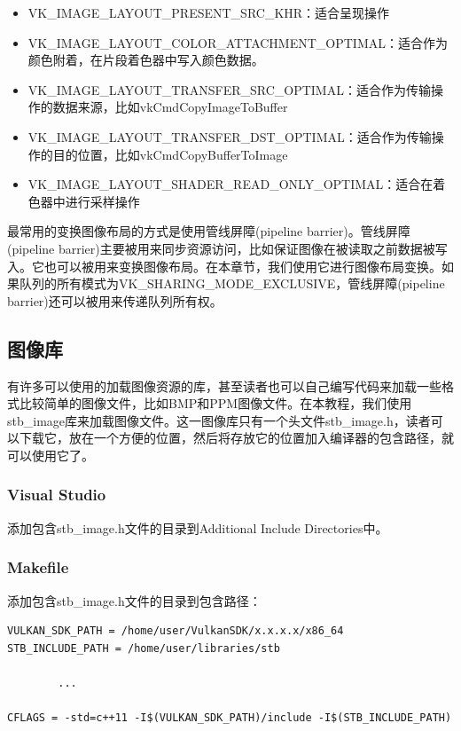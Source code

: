 \documentclass{ctexart}
\begin{document}
\begin{itemize}
	\item VK\_IMAGE\_LAYOUT\_PRESENT\_SRC\_KHR：适合呈现操作
	\item VK\_IMAGE\_LAYOUT\_COLOR\_ATTACHMENT\_OPTIMAL：适合作为颜色附着，在片段着色器中写入颜色数据。
	\item VK\_IMAGE\_LAYOUT\_TRANSFER\_SRC\_OPTIMAL：适合作为传输操作的数据来源，比如vkCmdCopyImageToBuffer
	\item VK\_IMAGE\_LAYOUT\_TRANSFER\_DST\_OPTIMAL：适合作为传输操作的目的位置，比如vkCmdCopyBufferToImage
	\item VK\_IMAGE\_LAYOUT\_SHADER\_READ\_ONLY\_OPTIMAL：适合在着色器中进行采样操作
\end{itemize}

最常用的变换图像布局的方式是使用管线屏障(pipeline barrier)。管线屏障(pipeline barrier)主要被用来同步资源访问，比如保证图像在被读取之前数据被写入。它也可以被用来变换图像布局。在本章节，我们使用它进行图像布局变换。如果队列的所有模式为VK\_SHARING\_MODE\_EXCLUSIVE，管线屏障(pipeline barrier)还可以被用来传递队列所有权。

\subsection{图像库}

有许多可以使用的加载图像资源的库，甚至读者也可以自己编写代码来加载一些格式比较简单的图像文件，比如BMP和PPM图像文件。在本教程，我们使用stb\_image库来加载图像文件。这一图像库只有一个头文件stb\_image.h，读者可以下载它，放在一个方便的位置，然后将存放它的位置加入编译器的包含路径，就可以使用它了。

\subsubsection{Visual Studio}

添加包含stb\_image.h文件的目录到Additional Include Directories中。

\subsubsection{Makefile}

添加包含stb\_image.h文件的目录到包含路径：

\begin{lstlisting}[language={[ANSI]C}]
VULKAN_SDK_PATH = /home/user/VulkanSDK/x.x.x.x/x86_64
STB_INCLUDE_PATH = /home/user/libraries/stb

		...

CFLAGS = -std=c++11 -I$(VULKAN_SDK_PATH)/include -I$(STB_INCLUDE_PATH)
\end{lstlisting}
\end{document}
